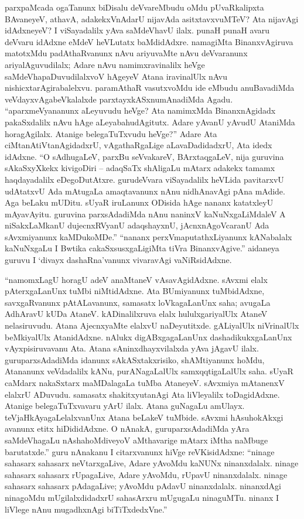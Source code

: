 parxpaMcada ogaTanunx biDisalu deVvareMbudu oMdu pUvaRkalipxta BAvaneyeV, athavA, adakekxVnAdarU nijavAda asitxtavxvuMTeV? Ata nijavAgi idAdxneyeV? I viSayadalilx yAva saMdeVhavU ilalx. punaH punaH avaru deVvaru idAdxne eMdeV heVLutatx baMdidAdxre. namagiMta BinanxvAgiruva matotxMdu padAthaRvanunx nAvu ariyuvaMte nAvu deVvaranunx ariyalAguvudilalx; Adare nAvu namimxravinalilx heVge saMdeVhapaDuvudilalxvoV hAgeyeV Atana iravinalUlx nAvu nishicxtarAgirabalelxvu. paramAthaR vasutxvoMdu ide eMbudu anuBavadiMda veVdayxvAgabeVkalalxde parxtayxkASxnumAnadiMda Agadu. ``aparxmeVyananunx aLeyuvudu heVge? Ata namimxMda BinanxnAgidadx pakaSxdalilx nAvu hAge aLeyabahudAgitutx. Adare yAvanU yAvudU AtaniMda horagAgilalx. Atanige belegaTuTxvudu heVge?'' Adare Ata ciMtanAtiVtanAgidadxrU, vAgathaRgaLige aLavaDadidadxrU, Ata idedx idAdxne. ``O sAdhugaLeV, parxBu seVvakareV, BArxtaqgaLeV, nija guruvina sAkaSxyXkekx kivigoDiri -- adaqSaTx shAligaLu mAtarx adakekx tamamx haqdayadalilx eDegoDutAtxre. gurudeVvara viSayadalilx heVLida pavitarxvU udAtatxvU Ada mAtugaLa amaqtavanunx nAnu nidhAnavAgi pAna mAdide. Aga beLaku mUDitu. sUyaR iruLanunx ODisida hAge nananx katatxleyU mAyavAyitu. guruvina parxsAdadiMda nAnu naninxV kaNuNxgaLiMdaleV A niSakxLaMkanU dujecnxRVyanU adaqshayxnU, jAcnxnAgoVcaranU Ada sAvxmiyanunx kaMDukoMDe.'' ``nananx perxVmaputathxLiyanunx kANabalalx kaNuNxgaLu I Bwtika cakaSxsusxgaLigiMta tiVra BinanxvAgive.'' aidaneya guruvu I `divayx dashaRna'vanunx vivaravAgi vaNiRsidAdxne.

``namomxLagU horagU adeV anaMtaneV vAsavAgidAdxne. sAvxmi elalx pAterxgaLanUnx tuMbi niMtidAdxne. Ata BUmiyanunx tuMbidAdxne, savxgaRvanunx pAtALavanunx, samasatx loVkagaLanUnx saha; avugaLa AdhAravU kUDa AtaneV. kADinalilxruva elalx hululxgariyalUlx AtaneV nelasiruvudu. Atana AjecnxyaMte elalxvU naDeyutitxde. gALiyalUlx niVrinalUlx beMkiyalUlx AtanidAdxne. nAlukx digABxgagaLanUnx dashadikukxgaLanUnx vAyxpisiruvavanu Ata. Atana sAninxdhayxvilalxda yAva jAgavU ilalx. guruparxsAdadiMda idanunx sAkASxtakxrisiko, shAMtiyanunx hoMdu, Atananunx veVdadalilx kANu, purANagaLalUlx samxqqtigaLalUlx saha. sUyaR caMdarx nakaSxtarx maMDalagaLa tuMba AtaneyeV. sAvxmiya mAtanenxV elalxrU ADuvudu. samasatx shakitxyutanAgi Ata liVleyalilx toDagidAdxne. Atanige belegaTuTxvavaru yArU ilalx. Atana guNagaLu amUlayx. teVjaHkAyagaLelalxvanUnx Atana beLakeV tuMbide. sAvxmi hAsuhokAkxgi avanunx etitx hiDididAdxne. O nAnakA, guruparxsAdadiMda yAra saMdeVhagaLu nAshahoMdiveyoV aMthavarige mAtarx iMtha naMbuge barutatxde.'' guru nAnakanu I citarxvanunx hiVge reVKisidAdxne: ``ninage sahasarx sahasarx neVtarxgaLive, Adare yAvoMdu kaNUNx ninanxdalalx. ninage sahasarx sahasarx rUpagaLive, Adare yAvoMdu, rUpavU ninanxdalalx. ninage sahasarx sahasarx pAdagaLive; yAvoMdu pAdavU ninanxdalalx. ninanxdAgi ninagoMdu mUgilalxdidadxrU sahasArxru mUgugaLu ninaguMTu. ninanx I liVlege nAnu mugadhxnAgi biTiTxdedxVne.''

